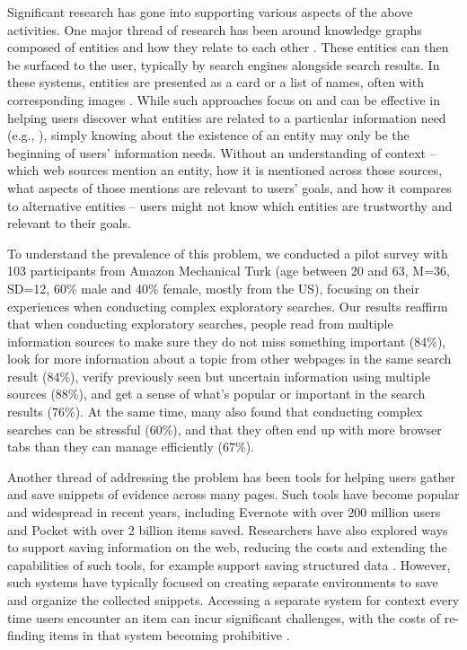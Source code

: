 Significant research has gone into supporting various aspects of the above activities. One major thread of research has been around knowledge graphs composed of entities and how they relate to each other \cite{dbpedia}. These entities can then be surfaced to the user, typically by search engines alongside search results. In these systems, entities are presented as a card or a list of names, often with corresponding images \cite{bota}. While such approaches focus on and can be effective in helping users discover what entities are related to a particular information need (e.g., \cite{miliaraki2015selena}), simply knowing about the existence of an entity may only be the beginning of users' information needs. Without an understanding of context -- which web sources mention an entity, how it is mentioned across those sources, what aspects of those mentions are relevant to users' goals, and how it compares to alternative entities -- users might not know which entities are trustworthy and relevant to their goals.


To understand the prevalence of this problem, we conducted a pilot survey with 103 participants from Amazon Mechanical Turk (age between 20 and 63, M=36, SD=12, 60\% male and 40\% female, mostly from the US), focusing on their experiences when conducting complex exploratory searches. Our results reaffirm that when conducting exploratory searches, people read from multiple information sources to make sure they do not miss something important (84\%), look for more information about a topic from other webpages in the same search result (84\%), verify previously seen but uncertain information using multiple sources (88\%), and get a sense of what's popular or important in the search results (76\%). At the same time, many also found that conducting complex searches can be stressful (60\%), and that they often end up with more browser tabs than they can manage efficiently (67\%).

Another thread of addressing the problem has been tools for helping users gather and save snippets of evidence across many pages. Such tools have become popular and widespread in recent years, including Evernote with over 200 million users and Pocket with over 2 billion items saved. Researchers have also explored ways to support saving information on the web, reducing the costs and extending the capabilities of such tools, for example support saving structured data \cite{thresher,bier2006entity}. However, such systems have typically focused on creating separate environments to save and organize the collected snippets.  Accessing a separate system for context every time users encounter an item can incur significant challenges, with the costs of re-finding items in that system becoming prohibitive \cite{notetoself}.

